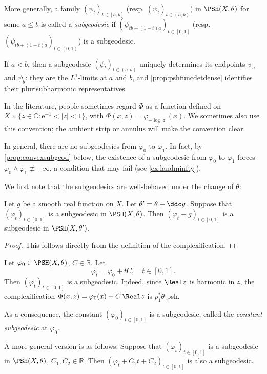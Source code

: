 More generally, a family $(\psi_t)_{t\in [a,b]}$ (resp. $(\psi_t)_{t\in (a,b)}$) in $\PSH(X,\theta)$ for some $a\leq b$ is called a \emph{subgeodesic} if $(\psi_{tb+(1-t)a})_{t\in [0,1]}$ (resp. $(\psi_{tb+(1-t)a})_{t\in (0,1)}$) is a subgeodesic.

\begin{remark}
    If $a<b$, then a subgeodesic $(\psi_t)_{t\in (a,b)}$ uniquely determines its endpoints $\psi_a$ and $\psi_b$: they are the $L^1$-limits at $a$ and $b$, and \cref{prop:pshfuncdetdense} identifies their plurisubharmonic representatives.
\end{remark}

\begin{remark}\label{rmk:complexify1}
In the literature, people sometimes regard $\Phi$ as a function defined on $X\times\{z\in \mathbb{C}: \mathrm{e}^{-1}<|z|<1\}$, with $\Phi(x,z)=\varphi_{-\log |z|}(x)$. We sometimes also use this convention; the ambient strip or annulus will make the convention clear.
\end{remark}



In general, there are no subgeodesics from $\varphi_0$ to $\varphi_1$. In fact, by \cref{prop:convexsubgeod} below, the existence of a subgeodesic from $\varphi_0$ to $\varphi_1$ forces $\varphi_0\land\varphi_1\not\equiv-\infty$, a condition that may fail (see \cref{ex:landminfty}).

We first note that the subgeodesics are well-behaved under the change of $\theta$:
\begin{proposition}\label{prop:subgeodindeptheta}
    Let $g$ be a smooth real function on $X$.
    Let $\theta'=\theta+\ddc g$. Suppose that $(\varphi_t)_{t\in [0,1]}$ is a subgeodesic in $\PSH(X,\theta)$. Then $(\varphi_t-g)_{t\in [0,1]}$ is a subgeodesic in $\PSH(X,\theta')$.
\end{proposition}
\begin{proof}
    This follows directly from the definition of the complexification.
\end{proof}

\begin{example}\label{ex:linearsubgeod}
    Let $\varphi_0\in \PSH(X,\theta)$, $C\in \mathbb{R}$. Let
    \[
    \varphi_t=\varphi_0+tC,\quad t\in [0,1].
    \]
    Then $(\varphi_t)_{t\in [0,1]}$ is a subgeodesic.
    Indeed, since $\Real z$ is harmonic in $z$, the complexification $\Phi(x,z)=\varphi_0(x)+C\,\Real z$ is $p_1^*\theta$-psh.

    As a consequence, the constant $(\varphi_0)_{t\in [0,1]}$ is a subgeodesic, called the \emph{constant subgeodesic} at $\varphi_0$.

    A more general version is as follows: Suppose that $(\varphi_t)_{t\in [0,1]}$ is a subgeodesic in $\PSH(X,\theta)$, $C_1,C_2\in \mathbb{R}$. Then $(\varphi_t+C_1t+C_2)_{t\in [0,1]}$ is also a subgeodesic.
\end{example}


